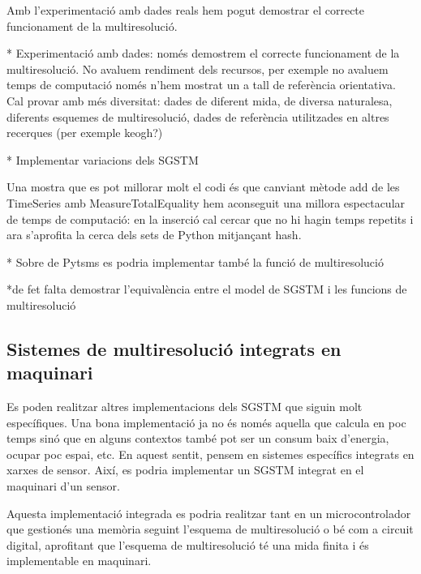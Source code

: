



Amb l'experimentació amb dades reals hem pogut demostrar el correcte funcionament de la multiresolució. 

* Experimentació amb dades: només demostrem el correcte funcionament de la multiresolució. No avaluem rendiment dels recursos, per exemple no avaluem temps de computació només n'hem mostrat un a tall de referència orientativa.  Cal provar amb més diversitat: dades de diferent mida, de diversa naturalesa, diferents esquemes de multiresolució, dades de referència utilitzades en altres recerques (per exemple keogh?)





* Implementar variacions dels \gls{SGSTM}


  Una mostra que es pot millorar molt
el codi és que canviant mètode add de les TimeSeries amb
MeasureTotalEquality hem aconseguit una millora espectacular de temps
de computació: en la inserció cal cercar que no hi hagin temps
repetits i ara s'aprofita la cerca dels sets de Python mitjançant
hash.

* Sobre de Pytsms es podria implementar també la funció de multiresolució

*de fet falta demostrar l'equivalència entre el model de SGSTM i les funcions de multiresolució






\subsection{Sistemes de multiresolució  integrats en maquinari}

Es poden realitzar altres implementacions dels \gls{SGSTM} que siguin
molt específiques. Una bona implementació ja no és només aquella que
calcula en poc temps sinó que en alguns contextos també pot ser un
consum baix d'energia, ocupar poc espai, etc.  En aquest sentit,
pensem en sistemes específics integrats en xarxes de sensor. Així, es
podria implementar un \gls{SGSTM} integrat en el maquinari d'un sensor.

Aquesta implementació integrada es podria realitzar tant en un
microcontrolador que gestionés una memòria seguint l'esquema de
multiresolució o bé com a circuit digital, aprofitant que l'esquema de
multiresolució té una mida finita i és implementable en maquinari.


